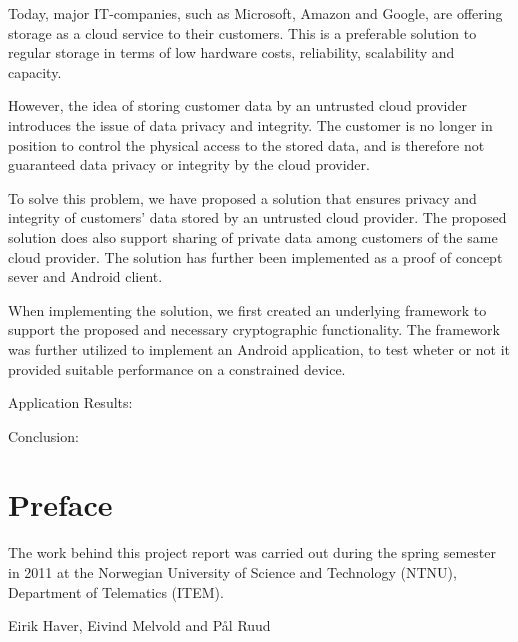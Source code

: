 \documentclass[pdftex,english,10pt,b5paper,twoside]{book}
\begin{document}
Today, major IT-companies, such as Microsoft, Amazon and Google, are offering
storage as a cloud service to their customers. This is a preferable solution to
regular storage in terms of low hardware costs, reliability, scalability and capacity.

However, the idea of storing customer data by an untrusted cloud provider
introduces the issue of data privacy and integrity. The customer is no longer in
position to control the physical access to the stored data, and is therefore
not guaranteed data privacy or integrity by the cloud provider.

To solve this problem, we have proposed a solution that ensures
privacy and integrity of customers' data stored by an untrusted cloud provider.
The proposed solution does also support sharing of private data among customers
of the same cloud provider. The solution has further been implemented as a
proof of concept sever and Android client.

When implementing the solution, we first created an underlying framework to support the
proposed and necessary cryptographic functionality. The framework was further
utilized to implement an Android application, to test wheter or not it provided
suitable performance on a constrained device.

Application Results:

Conclusion:


\chapter*{Preface}

The work behind this project report was carried out during the spring semester
in 2011 at the Norwegian University of Science and Technology (NTNU), Department
of Telematics (ITEM).
\vspace{13pt}

\begin{center}
Eirik Haver, Eivind Melvold and Pål Ruud
\vspace{13pt}

\end{center}

\tableofcontents

\cleardoublepage
{}
{}
\listoffigures

\cleardoublepage
{}
{}
\listoftables
\end{document}

